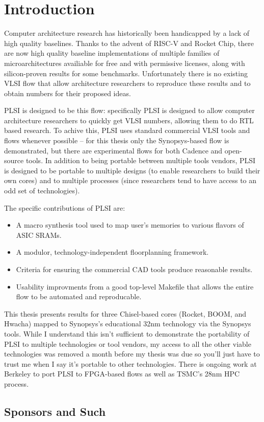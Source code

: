 \documentclass{article}
\begin{document}
\chapter{Introduction}

Computer architecture research has historically been handicapped by a lack of
high quality baselines.  Thanks to the advent of RISC-V and Rocket Chip, there
are now high quality baseline implementations of multiple families of
microarchitectures availiable for free and with permissive licenses, along with
silicon-proven results for some benchmarks.  Unfortunately there is no existing
VLSI flow that allow architecture researchers to reproduce these results and to
obtain numbers for their proposed ideas.

PLSI is designed to be this flow: specifically PLSI is designed to allow
computer architecture researchers to quickly get VLSI numbers, allowing them to
do RTL based research.  To achive this, PLSI uses standard commercial VLSI
tools and flows whenever possible -- for this thesis only the Synopsys-based
flow is demonstrated, but there are experimental flows for both Cadence and
open-source tools.  In addition to being portable between multiple tools
vendors, PLSI is designed to be portable to multiple designs (to enable
researchers to build their own cores) and to multiple processes (since
researchers tend to have access to an odd set of technologies).

The specific contributions of PLSI are:

\begin{itemize}
\item A macro synthesis tool used to map user's memories to various flavors of
ASIC SRAMs.
\item A modulor, technology-independent floorplanning framework.
\item Criteria for ensuring the commercial CAD tools produce reasonable results.
\item Usability improvments from a good top-level Makefile that allows the
entire flow to be automated and reproducable.
\end{itemize}

This thesis presents results for three Chisel-based cores (Rocket, BOOM, and
Hwacha) mapped to Synopsys's educational 32nm technology via the Synopsys
tools.  While I understand this isn't sufficient to demonstrate the portability
of PLSI to multiple technologies or tool vendors, my access to all the other
viable technologies was removed a month before my thesis was due so you'll just
have to trust me when I say it's portable to other technologies.  There is
ongoing work at Berkeley to port PLSI to FPGA-based flows as well as TSMC's
28nm HPC process.

\section{Sponsors and Such}

\end{document}
